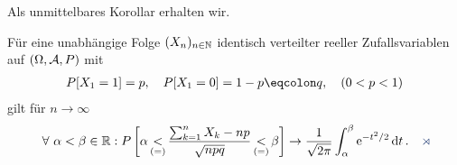 Als unmittelbares Korollar erhalten wir.

\addtocounter{cor}{1}

\begin{cor}
\label{cor:9.2}
Für eine unabhängige Folge $(X_{n})_{n\in \N}$ identisch verteilter
reeller Zufallsvariablen auf $(\Omega, \AA,P)$ mit
\begin{align*}
P[X_{1} =1]=p,\quad P[X_{1}=0] = 1-p \defr q,\quad (0<p<1)
\end{align*}
gilt für $n\to\infty$
\begin{align*}
\forall \alpha < \beta \in \R :
P\left[\alpha\mathop{<}\limits_{(=)} \frac{\sum^ {n}_{k=1}
X_{k}-np}{\sqrt{npq}}\mathop{<}\limits_{(=)} \beta \right] \to
\frac{1}{\sqrt{2\pi}}\int^{\beta}_{\alpha }\e^ {-t^ {2}/2}\dt.\fishhere
\end{align*}
\end{cor}

